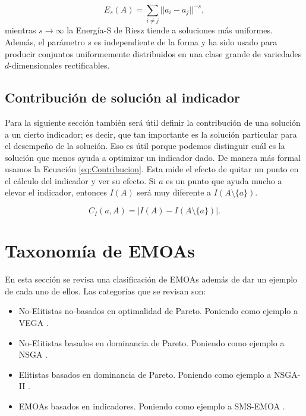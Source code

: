 \begin{equation} \label{eq:S_energy}
    E_s(A)=\sum_{i\neq j} ||a_i-a_j||^{-s},
\end{equation}
mientras $s\rightarrow \infty$ la Energía-S de Riesz tiende a soluciones más uniformes. Además, el parámetro $s$ es independiente de la forma y ha sido usado para producir conjuntos uniformemente distribuidos en una clase grande de variedades $d$-dimensionales rectificables.




\subsection*{Contribución de solución al indicador}
Para la siguiente sección también será útil definir la contribución de una solución a un cierto indicador; es decir, que tan importante es la solución particular para el desempeño de la solución. Eso es útil porque podemos distinguir cuál es la solución que menos ayuda a optimizar un indicador dado. De manera más formal usamos la Ecuación \eqref{eq:Contribucion}. Esta mide el efecto de quitar un punto en el cálculo del indicador y ver su efecto. Si $a$ es un punto que ayuda mucho a elevar el indicador, entonces $I(A)$ será muy diferente a $I(A \setminus \{a\})$.

\begin{equation} \label{eq:Contribucion}
    C_I(a,A)=|I(A)-I(A \setminus \{a\}) |.
\end{equation}


\section{Taxonomía de EMOAs} \label{sec:QIs_tax}

En esta sección se revisa una clasificación de EMOAs además de dar un ejemplo de cada uno de ellos. Las categorías que se revisan son: 

\begin{itemize}
\item No-Elitistas no-basados en optimalidad de Pareto. Poniendo como ejemplo a VEGA \cite{schafferMultipleObjectiveOptimization1984}.
\item No-Elitistas basados en dominancia de Pareto. Poniendo como ejemplo a NSGA \cite{debFastElitistNondominated2000}.
\item Elitistas basados en dominancia de Pareto. Poniendo como ejemplo a NSGA-II \cite{seifbarghyNovelMetaheuristicAlgorithm2016}.
\item EMOAs basados en indicadores. Poniendo como ejemplo a SMS-EMOA \cite{SMS-EMOA}.
\end{itemize}


